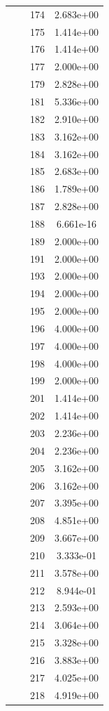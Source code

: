 \documentclass[12pt]{article}
\begin{document}
\begin{longtable}{@{}cccc@{}}
 &  & 174 & 2.683e+00 \\
 &  & 175 & 1.414e+00 \\
 &  & 176 & 1.414e+00 \\
 &  & 177 & 2.000e+00 \\
 &  & 179 & 2.828e+00 \\
 &  & 181 & 5.336e+00 \\
 &  & 182 & 2.910e+00 \\
 &  & 183 & 3.162e+00 \\
 &  & 184 & 3.162e+00 \\
 &  & 185 & 2.683e+00 \\
 &  & 186 & 1.789e+00 \\
 &  & 187 & 2.828e+00 \\
 &  & 188 & 6.661e-16 \\
 &  & 189 & 2.000e+00 \\
 &  & 191 & 2.000e+00 \\
 &  & 193 & 2.000e+00 \\
 &  & 194 & 2.000e+00 \\
 &  & 195 & 2.000e+00 \\
 &  & 196 & 4.000e+00 \\
 &  & 197 & 4.000e+00 \\
 &  & 198 & 4.000e+00 \\
 &  & 199 & 2.000e+00 \\
 &  & 201 & 1.414e+00 \\
 &  & 202 & 1.414e+00 \\
 &  & 203 & 2.236e+00 \\
 &  & 204 & 2.236e+00 \\
 &  & 205 & 3.162e+00 \\
 &  & 206 & 3.162e+00 \\
 &  & 207 & 3.395e+00 \\
 &  & 208 & 4.851e+00 \\
 &  & 209 & 3.667e+00 \\
 &  & 210 & 3.333e-01 \\
 &  & 211 & 3.578e+00 \\
 &  & 212 & 8.944e-01 \\
 &  & 213 & 2.593e+00 \\
 &  & 214 & 3.064e+00 \\
 &  & 215 & 3.328e+00 \\
 &  & 216 & 3.883e+00 \\
 &  & 217 & 4.025e+00 \\
 &  & 218 & 4.919e+00 \\

\end{longtable}
\end{document}
